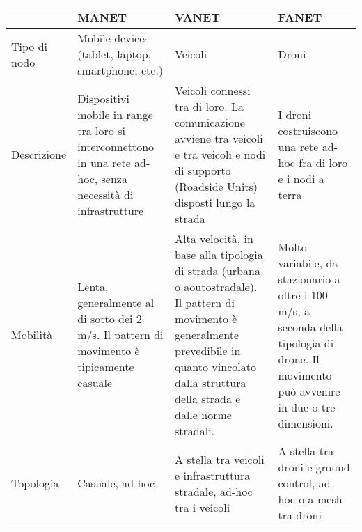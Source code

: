 \begin{table}[]
	\small
	\centering
	\begin{tabular}{|p{2.2cm}|p{3cm}|p{3cm}|p{3cm}|}
		\hline
		& MANET                                                                                                         & VANET                                                                                                                                                                                                 & FANET                                                                                                                                     \\ \hline
		Tipo di nodo       & Mobile devices (tablet, laptop, smartphone, etc.)                                                             & Veicoli                                                                                                                                                                                               & Droni                                                                                                                                     \\ \hline
		Descrizione        & Dispositivi mobile in range tra loro si interconnettono in una rete ad-hoc, senza necessità di infrastrutture & Veicoli connessi tra di loro. La comunicazione avviene tra veicoli e tra veicoli e nodi di supporto (Roadside Units) disposti lungo la strada              & I droni costruiscono una rete ad-hoc fra di loro e i nodi a terra                                                                         \\ \hline
		Mobilità           & Lenta, generalmente al di sotto dei 2 m/s. Il pattern di movimento è tipicamente casuale                      & Alta velocità, in base alla tipologia di strada (urbana o aoutostradale). Il pattern di movimento è generalmente prevedibile in quanto vincolato dalla struttura della strada e dalle norme stradali. & Molto variabile, da stazionario a oltre i 100 m/s, a seconda della tipologia di drone. Il movimento può avvenire in due o tre dimensioni. \\ \hline
		Topologia          & Casuale, ad-hoc                                                                                               & A stella tra veicoli e infrastruttura stradale, ad-hoc tra i veicoli                                                                                                                                  & A stella tra droni e ground control, ad-hoc o a mesh tra droni                                                                            \\ \hline

\end{tabular}
\end{table}
